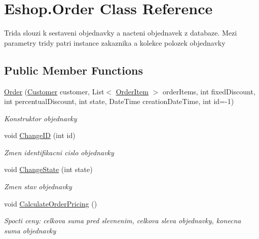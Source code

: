\hypertarget{class_eshop_1_1_order}{}\section{Eshop.\+Order Class Reference}
\label{class_eshop_1_1_order}


Trida slouzi k sestaveni objednavky a nacteni objednavek z databaze. Mezi parametry tridy patri instance zakaznika a kolekce polozek objednavky  


\subsection*{Public Member Functions}
\begin{DoxyCompactItemize}
\item 
\mbox{\hyperlink{class_eshop_1_1_order_a7521c71e22f3d753e91f5fbfe53eee20}{Order}} (\mbox{\hyperlink{class_eshop_1_1_customer}{Customer}} customer, List$<$ \mbox{\hyperlink{class_eshop_1_1_order_item}{Order\+Item}} $>$ order\+Items, int fixed\+Discount, int percentual\+Discount, int state, Date\+Time creation\+Date\+Time, int id=-\/1)
\begin{DoxyCompactList}\small\item\em Konstruktor objednavky \end{DoxyCompactList}\item 
void \mbox{\hyperlink{class_eshop_1_1_order_a7fee74a9ab6d7a0f97e913a5a7d327b8}{Change\+ID}} (int id)
\begin{DoxyCompactList}\small\item\em Zmen identifikacni cislo objednavky \end{DoxyCompactList}\item 
void \mbox{\hyperlink{class_eshop_1_1_order_a33412d95cfca5324b7f0c15daea7f3f4}{Change\+State}} (int state)
\begin{DoxyCompactList}\small\item\em Zmen stav objednavky \end{DoxyCompactList}\item 
void \mbox{\hyperlink{class_eshop_1_1_order_a5ca64e128e83878de3eeea26c8c61fb1}{Calculate\+Order\+Pricing}} ()
\begin{DoxyCompactList}\small\item\em Spocti ceny\+: celkova suma pred slevnenim, celkova sleva objednavky, konecna suma objednavky \end{DoxyCompactList}\end{DoxyCompactItemize}

